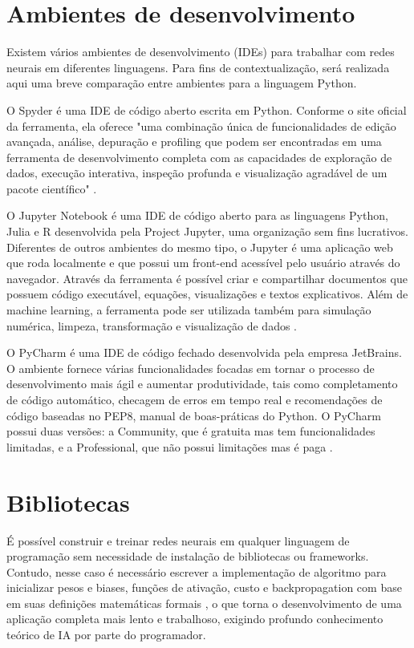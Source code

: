 \section{Ambientes de desenvolvimento}
Existem vários ambientes de desenvolvimento (IDEs) para trabalhar com redes neurais em diferentes linguagens. Para fins de contextualização, será realizada aqui uma breve comparação entre ambientes para a linguagem Python.

O Spyder é uma IDE de código aberto escrita em Python. Conforme o site oficial da ferramenta, ela oferece "uma combinação única de funcionalidades de edição avançada, análise, depuração e profiling que podem ser encontradas em uma ferramenta de desenvolvimento completa com as capacidades de exploração de dados, execução interativa, inspeção profunda e visualização agradável de um pacote científico" \cite{spyder20}.

O Jupyter Notebook é uma IDE de código aberto para as linguagens Python, Julia e R desenvolvida pela Project Jupyter, uma organização sem fins lucrativos. Diferentes de outros ambientes do mesmo tipo, o Jupyter é uma aplicação web que roda localmente e que possui um front-end acessível pelo usuário através do navegador. Através da ferramenta é possível criar e compartilhar documentos que possuem código executável, equações, visualizações e textos explicativos. Além de machine learning, a ferramenta pode ser utilizada também para simulação numérica, limpeza, transformação e visualização de dados \cite{jupyter20}.

O PyCharm é uma IDE de código fechado desenvolvida pela empresa JetBrains. O ambiente fornece várias funcionalidades focadas em tornar o processo de desenvolvimento mais ágil e aumentar produtividade, tais como completamento de código automático, checagem de erros em tempo real e recomendações de código baseadas no PEP8, manual de boas-práticas do Python. O PyCharm possui duas versões: a Community, que é gratuita mas tem funcionalidades limitadas, e a Professional, que não possui limitações mas é paga \cite{pycharm20}. 


\section{Bibliotecas}
É possível construir e treinar redes neurais em qualquer linguagem de programação sem necessidade de instalação de bibliotecas ou frameworks. Contudo, nesse caso é necessário escrever a implementação de algoritmo para inicializar pesos e biases, funções de ativação, custo e backpropagation com base em suas definições matemáticas formais \cite{peixeiro19}, o que torna o desenvolvimento de uma aplicação completa mais lento e trabalhoso, exigindo profundo conhecimento teórico de IA por parte do programador. 

